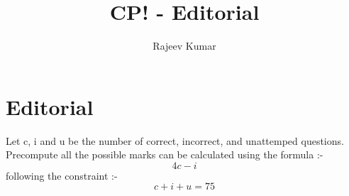 \documentclass{article}
\title{CP! - Editorial}
\author{Rajeev Kumar}
\date{}
\begin{document}
\maketitle

\section*{Editorial}
Let c, i and u be the number of correct, incorrect, and unattemped questions. Precompute all the possible marks can be calculated using the formula :-
$$4c - i$$
following the constraint :-
$$c + i + u = 75$$
\end{document}
